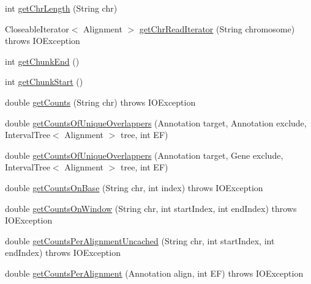 \begin{DoxyCompactItemize}
\item 
int \hyperlink{classbroad_1_1pda_1_1seq_1_1segmentation_1_1_generic_alignment_data_model_a02490a8b8be93112f028ad4a6e2f0fed}{get\+Chr\+Length} (String chr)
\item 
Closeable\+Iterator$<$ Alignment $>$ \hyperlink{classbroad_1_1pda_1_1seq_1_1segmentation_1_1_generic_alignment_data_model_a24ff73af0c763387c20a8357c83fd5fc}{get\+Chr\+Read\+Iterator} (String chromosome)  throws I\+O\+Exception 
\item 
int \hyperlink{classbroad_1_1pda_1_1seq_1_1segmentation_1_1_generic_alignment_data_model_ac3347ac18f32f257dbe64feb8e004663}{get\+Chunk\+End} ()
\item 
int \hyperlink{classbroad_1_1pda_1_1seq_1_1segmentation_1_1_generic_alignment_data_model_a0b0c6a88acbace9be14ddf06c5a7953c}{get\+Chunk\+Start} ()
\item 
double \hyperlink{classbroad_1_1pda_1_1seq_1_1segmentation_1_1_generic_alignment_data_model_a211c0c020c8dcba98e1e4aae65572077}{get\+Counts} (String chr)  throws I\+O\+Exception
\item 
double \hyperlink{classbroad_1_1pda_1_1seq_1_1segmentation_1_1_generic_alignment_data_model_af11ced151db31ab9e95d75cabeed3615}{get\+Counts\+Of\+Unique\+Overlappers} (Annotation target, Annotation exclude, Interval\+Tree$<$ Alignment $>$ tree, int E\+F)
\item 
double \hyperlink{classbroad_1_1pda_1_1seq_1_1segmentation_1_1_generic_alignment_data_model_a5fa26ea2bd8c08e3b846edf6c5341b93}{get\+Counts\+Of\+Unique\+Overlappers} (Annotation target, Gene exclude, Interval\+Tree$<$ Alignment $>$ tree, int E\+F)
\item 
double \hyperlink{classbroad_1_1pda_1_1seq_1_1segmentation_1_1_generic_alignment_data_model_aa0e60a4a8182d340bd443c08618b0f99}{get\+Counts\+On\+Base} (String chr, int index)  throws I\+O\+Exception 
\item 
double \hyperlink{classbroad_1_1pda_1_1seq_1_1segmentation_1_1_generic_alignment_data_model_a381f6ff8922c20cea08b090aae2b24a3}{get\+Counts\+On\+Window} (String chr, int start\+Index, int end\+Index)  throws I\+O\+Exception 
\item 
double \hyperlink{classbroad_1_1pda_1_1seq_1_1segmentation_1_1_generic_alignment_data_model_a73535e3b231500350fcd80a35d53ff6b}{get\+Counts\+Per\+Alignment\+Uncached} (String chr, int start\+Index, int end\+Index)  throws I\+O\+Exception 
\item 
double \hyperlink{classbroad_1_1pda_1_1seq_1_1segmentation_1_1_generic_alignment_data_model_aa6cb75b59a4ff7425b03ea133699040c}{get\+Counts\+Per\+Alignment} (Annotation align, int E\+F)  throws I\+O\+Exception 

\end{DoxyCompactItemize}
